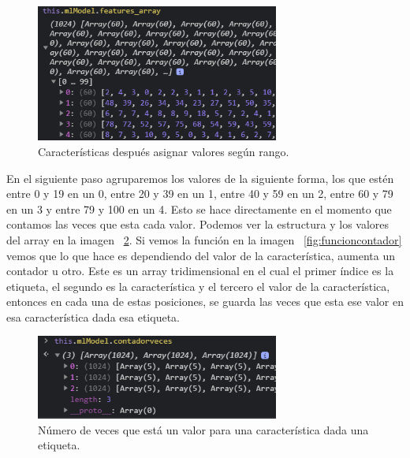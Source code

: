 \documentclass[a4paper, 12pt]{book}
\begin{document}
\begin{figure}
	\centering
	\includegraphics[width=8cm, keepaspectratio]{img/caracteristicasnormalizadas}
	\caption{Características después asignar valores según rango.}			
	\label{fig:caracteristicasnormalizadas}
\end{figure}

En el siguiente paso agruparemos los valores de la siguiente forma, los que estén entre 0 y 19 en un 0, entre 20 y 39 en un 1, entre 40 y 59 en un 2, entre 60 y 79 en un 3 y entre 79 y 100 en un 4. Esto se hace directamente en el momento que contamos las veces que esta cada valor. Podemos ver la estructura y los valores del array en la imagen ~\ref{fig:vecesvalor}. Si vemos la función en la imagen ~\ref{fig:funcioncontador} vemos que lo que hace es dependiendo del valor de la característica, aumenta un contador u otro. Este es un array tridimensional en el cual el primer índice es la etiqueta, el segundo es la característica y el tercero el valor de la característica, entonces en cada una de estas posiciones, se guarda las veces que esta ese valor en esa característica dada esa etiqueta.

\begin{figure}
	\centering
	\includegraphics[width=8cm, keepaspectratio]{img/vecesvalor}
	\caption{Número de veces que está un valor para una característica dada una etiqueta.}			
	\label{fig:vecesvalor}
\end{figure}
\end{document}
